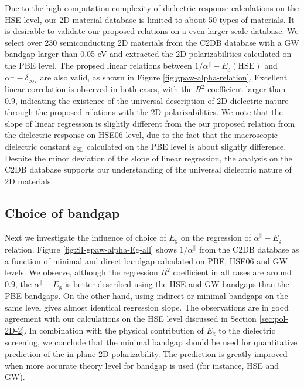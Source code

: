 \documentclass[manuscript=suppinfo,email=true,hyperref=true,keywords=false]{achemso}
\begin{document}
Due to the high computation complexity of dielectric response
calculations on the HSE level, our 2D material database is limited to
about 50 types of materials. It is desirable to validate our proposed
relations on a even larger scale database. We select over 230
semiconducting 2D materials from the C2DB database with a GW bandgap
larger than 0.05 eV and extracted the 2D polarizabilities calculated
on the PBE level. The propsed linear relations between
$1/\alpha^{\parallel}-E_{\mathrm{g}}(\mathrm{HSE})$ and
$\alpha^{\perp}-\delta_{\mathrm{cov}}$ are also valid,
as shown in Figure \ref{fig:gpaw-alpha-relation}. Excellent linear
correlation is observed in both cases, with the $R^{2}$ coefficient
larger than 0.9, indicating the existence of the universal description
of 2D dielectric nature through the proposed relations with the 2D
polarizabilities. We note that the slope of linear regression is
slightly different from the our proposed relation from the dielectric
response on HSE06 level, due to the fact that the macroscopic
dielectric constant $\varepsilon_{\mathrm{SL}}$ calculated on the PBE
level is about slightly difference. Despite the minor deviation of the
slope of linear regression, the analysis on the C2DB database supports
our understanding of the universal dielectric nature of 2D materials.

\subsection{Choice of bandgap}
\label{sec:gpaw-2}

Next we investigate the influence of choice of $E_{\mathrm{g}}$ on the
regression of $\alpha^{\parallel}-E_{\mathrm{g}}$ relation. Figure
\ref{fig:SI-gpaw-alpha-Eg-all} shows $1/\alpha^{\parallel}$ from the
C2DB database as a function of minimal and direct bandgap calculated
on PBE, HSE06 and GW levels. We observe,
although the regression $R^{2}$ coefficient in all cases are around
0.9, the $\alpha^{\parallel}-E_{\mathrm{g}}$ is better described using
the HSE and GW bandgaps than the PBE bandgaps. On the other hand,
using indirect or minimal bandgaps on the same level gives almost
identical regression slope. The observations are in good agreement
with our calculations on the HSE level discussed in Section
\ref{sec:pol-2D-2}. In combination with the physical contribution of
$E_{\mathrm{g}}$ to the dielectric screening, we conclude that the
minimal bandgap should be used for quantitative prediction of the
in-plane 2D polarizability. The prediction is greatly improved when
more accurate theory level for bandgap is used (for instance, HSE and GW).
\end{document}
